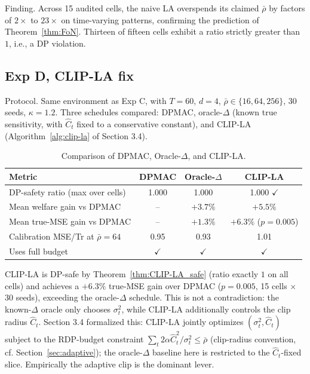 \documentclass{article}
\begin{document}
Finding. Across 15 audited cells, the naive LA overspends its claimed $\bar\rho$ by factors of $2\times$ to $23\times$ on time-varying patterns, confirming the prediction of Theorem~\ref{thm:FoN}. Thirteen of fifteen cells exhibit a ratio strictly greater than $1$, i.e., a DP violation.


\subsection{Exp D, CLIP-LA fix}

Protocol. Same environment as Exp C, with $T = 60$, $d = 4$, $\bar\rho \in \{16, 64, 256\}$, 30 seeds, $\kappa = 1.2$. Three schedules compared: DPMAC, oracle-$\Delta$ (known true sensitivity, with $\hat C_t$ fixed to a conservative constant), and CLIP-LA (Algorithm~\ref{alg:clip-la}  of Section 3.4).

\begin{table}[t]
\centering
\caption{Comparison of DPMAC, Oracle-$\Delta$, and CLIP-LA.}
\label{tab:clipla_main}
\renewcommand{\arraystretch}{1.15}
\begin{tabular}{lccc}
\hline
\textbf{Metric} & \textbf{DPMAC} & \textbf{Oracle-$\Delta$} & \textbf{CLIP-LA} \\
\hline
DP-safety ratio (max over cells) & 1.000 & 1.000 & 1.000 $\checkmark$ \\
Mean welfare gain vs DPMAC & -- & $+3.7\%$ & $+5.5\%$ \\
Mean true-MSE gain vs DPMAC & -- & $+1.3\%$ & $+6.3\%$ ($p = 0.005$) \\
Calibration MSE/Tr at $\bar\rho = 64$ & 0.95 & 0.93 & 1.01 \\
Uses full budget & $\checkmark$ & $\checkmark$ & $\checkmark$ \\
\hline
\end{tabular}
\end{table}

CLIP-LA is DP-safe by Theorem~\ref{thm:CLIP-LA_safe} (ratio exactly $1$ on all cells) and achieves a $+6.3\%$ true-MSE gain over DPMAC ($p = 0.005$, 15 cells $\times$ 30 seeds), exceeding the oracle-$\Delta$ schedule. This is not a contradiction: the known-$\Delta$ oracle only chooses $\sigma_t^2$, while CLIP-LA additionally controls the clip radius $\hat C_t$. Section 3.4 formalized this: CLIP-LA jointly optimizes $(\sigma_t^2, \hat C_t)$ subject to the RDP-budget constraint $\sum_t 2\alpha \hat C_t^2/\sigma_t^2 \le \bar\rho$ (clip-radius convention, cf. Section~\ref{sec:adaptive}); the oracle-$\Delta$ baseline here is restricted to the $\hat C_t$-fixed slice. Empirically the adaptive clip is the dominant lever.
\end{document}
